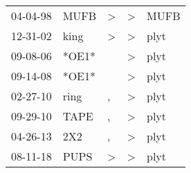 \begin{supertabular}{lllll}
 04-04-98 &   MUFB &  \textgreater &  \textgreater &  MUFB \\
 12-31-02 &   king &  \textgreater &  \textgreater &  plyt \\
 09-08-06 &  *OE1* &               &  \textgreater &  plyt \\
 09-14-08 &  *OE1* &               &  \textgreater &  plyt \\
 02-27-10 &   ring &             , &  \textgreater &  plyt \\
 09-29-10 &   TAPE &             , &  \textgreater &  plyt \\
 04-26-13 &    2X2 &             , &  \textgreater &  plyt \\
 08-11-18 &   PUPS &  \textgreater &  \textgreater &  plyt \\
\end{supertabular}
